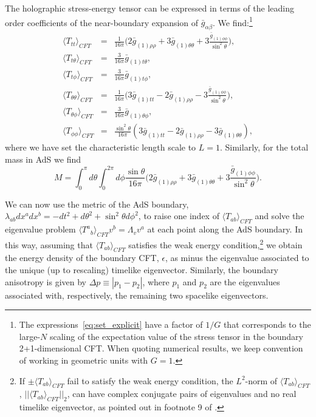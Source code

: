 \documentclass[a4paper,11pt]{article}
\numberwithin{equation}{section}
\begin{document}
The holographic stress-energy tensor can be expressed in terms of the leading order coefficients of the near-boundary expansion of $\bar{g}_{\alpha\beta}$. We find:\footnote{The expressions~\eqref{eq:set_explicit} have a factor of $1/G$ that corresponds to the large-$N$ scaling of the expectation value of the stress tensor in the boundary 2+1-dimensional CFT. When quoting numerical results, we keep convention of working in geometric units with $G=1$.}
\begin{eqnarray}
\label{eq:set_explicit}
\langle T_{tt}\rangle_{CFT}&=&\frac{1}{16\pi} \biggl(2\bar{g}_{(1)\rho\rho}+3\bar{g}_{(1)\theta\theta}+3\frac{\bar{g}_{(1)\phi\phi}}{\sin^2\theta}\biggr), \nonumber \\
\langle T_{t\theta}\rangle_{CFT}&=&\frac{3}{16\pi}\bar{g}_{(1)t\theta}, \nonumber \\
\langle T_{t\phi}\rangle_{CFT}&=&\frac{3}{16\pi}\bar{g}_{(1)t\phi}, \nonumber \\
\langle T_{\theta\theta}\rangle_{CFT}&=&\frac{1}{16\pi} \biggl(3\bar{g}_{(1)tt}-2\bar{g}_{(1)\rho\rho}-3\frac{\bar{g}_{(1)\phi\phi}}{\sin^2\theta}\biggr), \nonumber \\
\langle T_{\theta\phi}\rangle_{CFT}&=&\frac{3}{16\pi}\bar{g}_{(1)\theta\phi}, \nonumber \\
\langle T_{\phi\phi}\rangle_{CFT}&=&\frac{\sin^2\theta}{16\pi} (3\bar{g}_{(1)tt}-2\bar{g}_{(1)\rho\rho}-3\bar{g}_{(1)\theta\theta}),
\end{eqnarray}
where we have set the characteristic length scale to $L=1$. 
Similarly, for the total mass in AdS we find
\begin{equation}
\label{eq:AdSmasscalc}
M=\int_0^\pi d\theta \int_0^{2\pi}d\phi\frac{\sin\theta}{16\pi} \biggl(2\bar{g}_{(1)\rho\rho}+3\bar{g}_{(1)\theta\theta}+3\frac{\bar{g}_{(1)\phi\phi}}{\sin^2\theta}\biggr).
\end{equation}

We can now use the metric of the AdS boundary, $\lambda_{ab}dx^a dx^b=-dt^2+d\theta^2+\sin^2\theta d\phi^2$, to raise one index of $\langle T_{ab}\rangle_{CFT}$ and solve the eigenvalue problem $\langle {T^a}_{b}\rangle_{CFT} v^b=\Lambda_v v^a$ at each point along the AdS boundary. In this way, assuming that $\langle T_{ab}\rangle_{CFT}$ satisfies the weak energy condition,\footnote{If $\pm \langle T_{ab}\rangle_{CFT}$ fail to satisfy the weak energy condition, the $L^2$-norm of $\langle T_{ab}\rangle_{CFT}$, $||\langle T_{ab}\rangle_{CFT}||_2$, can have complex conjugate pairs of eigenvalues and no real timelike eigenvector, as pointed out in footnote 9 of \cite{Chesler:2013lia}.} we obtain the energy density of the boundary CFT, $\epsilon$, as minus the eigenvalue associated to the unique (up to rescaling) timelike eigenvector. Similarly, the boundary anisotropy is given by $\Delta p\equiv|p_1-p_2|$, where $p_1$ and $p_2$ are the eigenvalues associated with, respectively, the remaining two spacelike eigenvectors.
\end{document}
